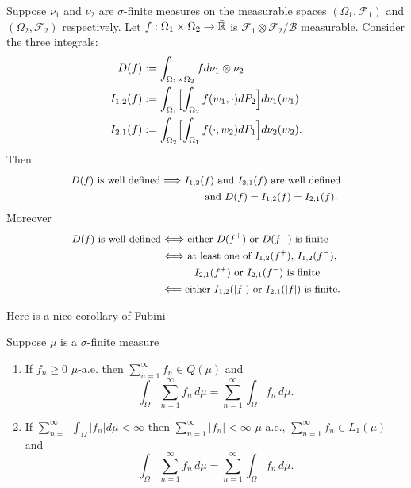 \begin{corollary} Suppose $\nu_1$ and $\nu_2$ are $\sigma$-finite measures on the measurable spaces $(\Omega_1,\mathcal F_1)$ and  $( \Omega_2, \mathcal F_2)$ respectively. Let $f:\Omega_1\times\Omega_2\rightarrow \bar{\Bbb R}$ is $\mathcal F_1\otimes \mathcal F_2/\mathcal B$ measurable. Consider the three integrals:
\begin{align*}
D(f)&:= \int_{\Omega_1\times\Omega_2} f d\nu_1\otimes \nu_2 \\
 I_{1,2}(f)&:= \int_{\Omega_1}\Bigl[ \int_{\Omega_2} f(w_1,\cdot) dP_2 \Bigr] d\nu_1(w_1)\\
 I_{2,1}(f)&:=\int_{\Omega_2}\Bigl[ \int_{\Omega_1} f(\cdot,w_2) dP_1 \Bigr] d\nu_2(w_2).
\end{align*}
Then
\begin{align*}
\text{\small $D(f)$ is well defined} &\Longrightarrow \text{\small $I_{1,2}(f)$ and $I_{2,1}(f)$ are well defined}\\
&\qquad\qquad\text{\small and $D(f)= I_{1,2}(f)= I_{2,1}(f)$}.
 \end{align*}
Moreover
\begin{align*}
\text{\small $D(f)$ is well defined} &\Longleftrightarrow\text{\small either $D(f^+)$ or $D(f^-)$ is finite}\\
&\Longleftrightarrow\text{\small at least one of $I_{1,2}(f^+)$, $I_{1,2}(f^-)$,}\\
&\qquad\quad\text{\small $I_{2,1}(f^+)$ or $I_{2,1}(f^-)$ is finite}\\
&\Longleftarrow \text{\small either $I_{1,2}(|f|)$ or $I_{2,1}(|f|)$ is finite.}\\
\end{align*}
\end{corollary}


Here is a nice corollary of Fubini

\begin{corollary}
\label{thm: Integration term by term}
Suppose $\mu$ is a $\sigma$-finite measure
\begin{enumerate}
\item If $f_n\geq 0$ $\mu$-a.e.  then  $\sum_{n=1}^\infty f_n\in Q(\mu)$ and
\[\int_\Omega \sum_{n=1}^\infty f_n  \, d\mu= \sum_{n=1}^\infty \int_\Omega  f_n  \, d\mu.\]
\item If $\sum_{n=1}^\infty \int_\Omega |f_n| d\mu<\infty$ then $\sum_{n=1}^\infty |f_n|<\infty$ $\mu$-a.e.,  $\sum_{n=1}^\infty f_n\in L_1(\mu)$ and
\[\int_\Omega \sum_{n=1}^\infty f_n  \, d\mu= \sum_{n=1}^\infty \int_\Omega  f_n  \, d\mu.\]
\end{enumerate}
\end{corollary}


